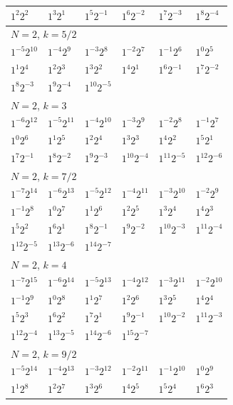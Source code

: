 \documentclass[12pt]{amsart}
\numberwithin{equation}{section}
\theoremstyle{plain}
\theoremstyle{definition}
\theoremstyle{remark}
\begin{document}
\begin{longtable}{llllll}
$1^{2}2^{2}$ & $1^{3}2^{1}$ & $1^{5}2^{-1}$ & $1^{6}2^{-2}$ & $1^{7}2^{-3}$ & $1^{8}2^{-4}$\\
\midrule
\multicolumn{6}{l}{$N=2$, $k=5/2$}\\
$1^{-5}2^{10}$ & $1^{-4}2^{9}$ & $1^{-3}2^{8}$ & $1^{-2}2^{7}$ & $1^{-1}2^{6}$ & $1^{0}2^{5}$\\
$1^{1}2^{4}$ & $1^{2}2^{3}$ & $1^{3}2^{2}$ & $1^{4}2^{1}$ & $1^{6}2^{-1}$ & $1^{7}2^{-2}$\\
$1^{8}2^{-3}$ & $1^{9}2^{-4}$ & $1^{10}2^{-5}$ & &&\\
\midrule
\multicolumn{6}{l}{$N=2$, $k=3$}\\
$1^{-6}2^{12}$ & $1^{-5}2^{11}$ & $1^{-4}2^{10}$ & $1^{-3}2^{9}$ & $1^{-2}2^{8}$ & $1^{-1}2^{7}$\\
$1^{0}2^{6}$ & $1^{1}2^{5}$ & $1^{2}2^{4}$ & $1^{3}2^{3}$ & $1^{4}2^{2}$ & $1^{5}2^{1}$\\
$1^{7}2^{-1}$ & $1^{8}2^{-2}$ & $1^{9}2^{-3}$ & $1^{10}2^{-4}$ & $1^{11}2^{-5}$ & $1^{12}2^{-6}$\\
\midrule
\multicolumn{6}{l}{$N=2$, $k=7/2$}\\
$1^{-7}2^{14}$ & $1^{-6}2^{13}$ & $1^{-5}2^{12}$ & $1^{-4}2^{11}$ & $1^{-3}2^{10}$ & $1^{-2}2^{9}$\\
$1^{-1}2^{8}$ & $1^{0}2^{7}$ & $1^{1}2^{6}$ & $1^{2}2^{5}$ & $1^{3}2^{4}$ & $1^{4}2^{3}$\\
$1^{5}2^{2}$ & $1^{6}2^{1}$ & $1^{8}2^{-1}$ & $1^{9}2^{-2}$ & $1^{10}2^{-3}$ & $1^{11}2^{-4}$\\
$1^{12}2^{-5}$ & $1^{13}2^{-6}$ & $1^{14}2^{-7}$ & &&\\
\midrule
\multicolumn{6}{l}{$N=2$, $k=4$}\\
$1^{-7}2^{15}$ & $1^{-6}2^{14}$ & $1^{-5}2^{13}$ & $1^{-4}2^{12}$ & $1^{-3}2^{11}$ & $1^{-2}2^{10}$\\
$1^{-1}2^{9}$ & $1^{0}2^{8}$ & $1^{1}2^{7}$ & $1^{2}2^{6}$ & $1^{3}2^{5}$ & $1^{4}2^{4}$\\
$1^{5}2^{3}$ & $1^{6}2^{2}$ & $1^{7}2^{1}$ & $1^{9}2^{-1}$ & $1^{10}2^{-2}$ & $1^{11}2^{-3}$\\
$1^{12}2^{-4}$ & $1^{13}2^{-5}$ & $1^{14}2^{-6}$ & $1^{15}2^{-7}$ & &\\
\midrule
\multicolumn{6}{l}{$N=2$, $k=9/2$}\\
$1^{-5}2^{14}$ & $1^{-4}2^{13}$ & $1^{-3}2^{12}$ & $1^{-2}2^{11}$ & $1^{-1}2^{10}$ & $1^{0}2^{9}$\\
$1^{1}2^{8}$ & $1^{2}2^{7}$ & $1^{3}2^{6}$ & $1^{4}2^{5}$ & $1^{5}2^{4}$ & $1^{6}2^{3}$\\

\end{longtable}
\end{document}

